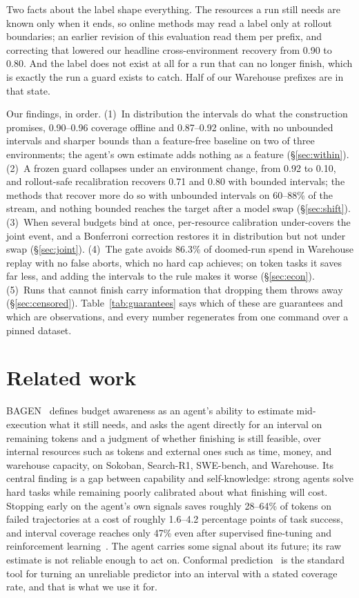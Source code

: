 Two facts about the label shape everything. The resources a run still needs are known only when it ends, so online methods may read a label only at rollout boundaries; an earlier revision of this evaluation read them per prefix, and correcting that lowered our headline cross-environment recovery from 0.90 to 0.80. And the label does not exist at all for a run that can no longer finish, which is exactly the run a guard exists to catch. Half of our Warehouse prefixes are in that state.

Our findings, in order. (1)~In distribution the intervals do what the construction promises, 0.90--0.96 coverage offline and 0.87--0.92 online, with no unbounded intervals and sharper bounds than a feature-free baseline on two of three environments; the agent's own estimate adds nothing as a feature (\S\ref{sec:within}). (2)~A frozen guard collapses under an environment change, from 0.92 to 0.10, and rollout-safe recalibration recovers 0.71 and 0.80 with bounded intervals; the methods that recover more do so with unbounded intervals on 60--88\% of the stream, and nothing bounded reaches the target after a model swap (\S\ref{sec:shift}). (3)~When several budgets bind at once, per-resource calibration under-covers the joint event, and a Bonferroni correction restores it in distribution but not under swap (\S\ref{sec:joint}). (4)~The gate avoids 86.3\% of doomed-run spend in Warehouse replay with no false aborts, which no hard cap achieves; on token tasks it saves far less, and adding the intervals to the rule makes it worse (\S\ref{sec:econ}). (5)~Runs that cannot finish carry information that dropping them throws away (\S\ref{sec:censored}). Table~\ref{tab:guarantees} says which of these are guarantees and which are observations, and every number regenerates from one command over a pinned dataset.

\section{Related work}
\label{sec:related}

BAGEN~\cite{lin2026bagen} defines budget awareness as an agent's ability to estimate mid-execution what it still needs, and asks the agent directly for an interval on remaining tokens and a judgment of whether finishing is still feasible, over internal resources such as tokens and external ones such as time, money, and warehouse capacity, on Sokoban, Search-R1, SWE-bench, and Warehouse. Its central finding is a gap between capability and self-knowledge: strong agents solve hard tasks while remaining poorly calibrated about what finishing will cost. Stopping early on the agent's own signals saves roughly 28--64\% of tokens on failed trajectories at a cost of roughly 1.6--4.2 percentage points of task success, and interval coverage reaches only 47\% even after supervised fine-tuning and reinforcement learning~\cite{lin2026bagen}. The agent carries some signal about its future; its raw estimate is not reliable enough to act on. Conformal prediction~\cite{angelopoulos2023gentle,lei2018distribution} is the standard tool for turning an unreliable predictor into an interval with a stated coverage rate, and that is what we use it for.

